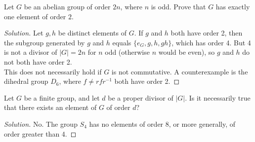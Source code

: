 \documentclass[12pt]{article}
\newenvironment{problem}[2][Problem]{\begin{trivlist}
\item[\hskip \labelsep {\bfseries #1}\hskip \labelsep {\bfseries #2.}]}{\end{trivlist}}
\newenvironment{solution}
  {\renewcommand\qedsymbol{$\blacksquare$}\begin{proof}[Solution]}
{\end{proof}}
\theoremstyle{remark}
\begin{document}
\begin{problem}{8.18}
  Let $G$ be an abelian group of order $2n$, where $n$ is odd.
  Prove that $G$ has exactly one element of order $2$.
\end{problem}
\begin{solution}
  Let $g,h$ be distinct elements of $G$. 
  If $g$ and $h$ both have order 2, then the subgroup generated by $g$ and $h$ 
  equals $\{e_G,g,h,gh\}$, which has order 4.
  But 4 is not a divisor of $|G|=2n$ for $n$ odd (otherwise $n$ would be even), so $g$ and $h$ do not both have
  order 2. \\
  This does not necessarily hold if $G$ is not commutative. 
  A counterexample is the dihedral group $D_6$, where $f\neq rfr^{-1}$ both have order 2.
\end{solution}
\begin{problem}{8.19}
  Let $G$ be a finite group, and let $d$ be a proper divisor of $|G|$.
  Is it necessarily true that there exists an element of $G$ of order $d$?
\end{problem}
\begin{solution}
  No.
  The group $S_4$ has no elements of order 8, or more generally, of order greater than 4.
\end{solution}
\end{document}
